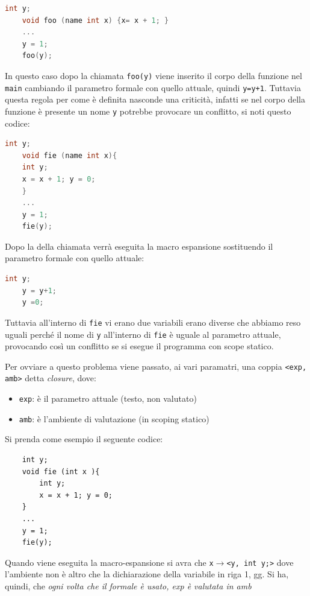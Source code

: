\begin{lstlisting}[language=C]
    int y;
    void foo (name int x) {x= x + 1; }
    ...
    y = 1;
    foo(y);    
\end{lstlisting}

In questo caso dopo la chiamata \texttt{foo(y)} viene inserito il corpo della funzione nel \texttt{main}  cambiando il parametro formale con quello attuale, quindi \texttt{y=y+1}. Tuttavia questa regola per come è definita nasconde una criticità, infatti se nel corpo della funzione è presente un nome \texttt{y} potrebbe provocare un conflitto, si noti questo codice:

\begin{lstlisting}[language=C]
    int y;
    void fie (name int x){
    int y;
    x = x + 1; y = 0;
    }
    ...
    y = 1;
    fie(y);
\end{lstlisting}

Dopo la della chiamata verrà eseguita la macro espansione sostituendo il parametro formale con quello attuale:
\begin{lstlisting}[language=C]
    int y;
    y = y+1;
    y =0;
\end{lstlisting}

Tuttavia all'interno di \texttt{fie} vi erano due variabili erano diverse che abbiamo reso uguali perché il nome di \texttt{y} all'interno di \texttt{fie} è uguale al parametro attuale, provocando così un conflitto se si esegue il programma con scope statico. 

Per ovviare a questo problema viene passato, ai vari paramatri, una coppia \texttt{<exp, amb>} detta \textit{closure}, dove:
\begin{itemize}
    \item \texttt{exp}: è il parametro attuale (testo, non valutato)
    \item \texttt{amb}: è l’ambiente di valutazione (in scoping statico)
\end{itemize}

Si prenda come esempio il seguente codice:
\begin{lstlisting}
    int y;
    void fie (int x ){
        int y;
        x = x + 1; y = 0;
    }
    ...
    y = 1;
    fie(y);
\end{lstlisting}

Quando viene eseguita la macro-espansione si avra che \texttt{x$\to$<y, int y;>} dove l'ambiente non è altro che la dichiarazione della variabile in riga 1, gg. Si ha, quindi, che \textit{ogni volta che il formale è usato, exp è valutata in amb}

